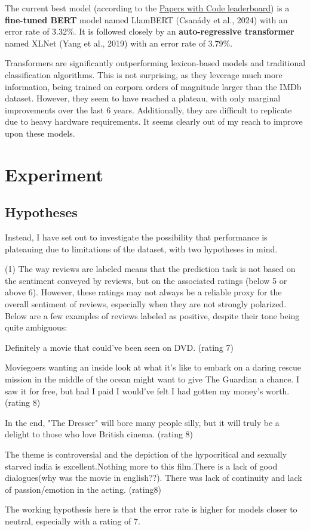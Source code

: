 \documentclass{article}
\begin{document}
The current best model (according to the \href{https://paperswithcode.com/sota/sentiment-analysis-on-imdb}{Papers with Code leaderboard}) is a \textbf{fine-tuned BERT} model named LlamBERT (Csanády et al., 2024) with an error rate of 3.32\%. It is followed closely by an \textbf{auto-regressive transformer} named XLNet (Yang et al., 2019) with an error rate of 3.79\%.

Transformers are significantly outperforming lexicon-based models and traditional classification algorithms. This is not surprising, as they leverage much more information, being trained on corpora orders of magnitude larger than the IMDb dataset. However, they seem to have reached a plateau, with only marginal improvements over the last 6 years. Additionally, they are difficult to replicate due to heavy hardware requirements. It seems clearly out of my reach to improve upon these models.

\section{Experiment}

\subsection{Hypotheses}

Instead, I have set out to investigate the possibility that performance is plateauing due to limitations of the dataset, with two hypotheses in mind.

(1) The way reviews are labeled means that the prediction task is not based on the sentiment conveyed by reviews, but on the associated ratings (below 5 or above 6). However, these ratings may not always be a reliable proxy for the overall sentiment of reviews, especially when they are not strongly polarized. Below are a few examples of reviews labeled as positive, despite their tone being quite ambiguous:

\begin{displayquote}
Definitely a movie that could've been seen on DVD. (rating 7)

Moviegoers wanting an inside look at what it's like to embark on a daring rescue mission in the middle of the ocean might want to give The Guardian a chance. I saw it for free, but had I paid I would've felt I had gotten my money's worth. (rating 8)

In the end, "The Dresser" will bore many people silly, but it will truly be a delight to those who love British cinema. (rating 8)

The theme is controversial and the depiction of the hypocritical and sexually starved india is excellent.Nothing more to this film.There is a lack of good dialogues(why was the movie in english??). There was lack of continuity and lack of passion/emotion in the acting. (rating8)
\end{displayquote}
The working hypothesis here is that the error rate is higher for models closer to neutral, especially with a rating of 7.
\end{document}
